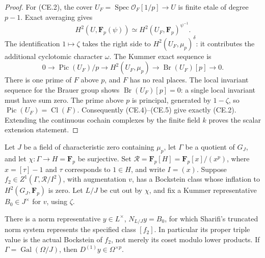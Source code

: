 \begin{proof}
For (CE.2), the cover
\(U_F=\operatorname{Spec}\mathcal O_F[1/p]\to U\) is finite
etale of degree \(p-1\).  Exact averaging gives
\[
 H^2(U,\mathbf F_p(\psi))
     \simeq H^2(U_F,\mathbf F_p)^{\psi^{-1}}.
                                                        \tag{CE.4}
\]
The identification \(1\mapsto\zeta\) takes the right side to
\(H^2(U_F,\mu_p)^\delta\): it contributes the additional
cyclotomic character \(\omega\).  The Kummer exact sequence is
\[
 0\longrightarrow \operatorname{Pic}(U_F)/p
 \longrightarrow H^2(U_F,\mu_p)
 \longrightarrow \operatorname{Br}(U_F)[p]\longrightarrow0.
                                                        \tag{CE.5}
\]
There is one prime of \(F\) above \(p\), and \(F\) has no real
places.  The local invariant sequence for the Brauer group shows
\(\operatorname{Br}(U_F)[p]=0\): a single local invariant must
have sum zero.  The prime above \(p\) is principal, generated
by \(1-\zeta\), so \(\operatorname{Pic}(U_F)=\operatorname{Cl}(F)\).
Consequently (CE.4)--(CE.5) give exactly (CE.2).  Extending the
continuous cochain complexes by the finite field \(k\) proves
the scalar extension statement.
\end{proof}

\begin{lemma}
Let \(J\) be a field of characteristic zero containing \(\mu_p\),
let \(\Gamma\) be a quotient of \(G_J\), and let
\(\chi:\Gamma\to H=\mathbf F_p\) be surjective.
Set \(\mathcal R=\mathbf F_p[H]=\mathbf F_p[x]/(x^p)\),
where \(x=[\tau]-1\) and \(\tau\) corresponds to \(1\in H\),
and write \(I=(x)\).
Suppose \(f_2\in Z^1(\Gamma,\mathcal R/I^2)\), with augmentation
\(v\), has a Bockstein class whose inflation to
\(H^2(G_J,\mathbf F_p)\) is zero.  Let \(L/J\) be cut out
by \(\chi\), and fix a Kummer representative \(B_0\in J^\times\)
for \(v\), using \(\zeta\).

There is a norm representative \(y\in L^\times\),
\(N_{L/J}y=B_0\), for which Sharifi's truncated norm system
represents the specified class \([f_2]\).  In particular its
proper triple value is the actual Bockstein of \(f_2\),
not merely its coset modulo lower products.  If
\(\Gamma=\operatorname{Gal}(\Omega/J)\), then
\(D^{(1)}y\in\Omega^{\times p}\).
\end{lemma}

